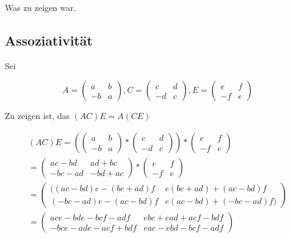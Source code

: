\documentclass{article}
\begin{document}
Was zu zeigen war.

\subsection*{Assoziativität}

Sei

\[
A =
    \begin{pmatrix}
      a & b \\
      -b & a
    \end{pmatrix}
,
C =
    \begin{pmatrix}
      c & d \\
      -d & c
    \end{pmatrix}
,
E =
    \begin{pmatrix}
      e & f \\
      -f & e
    \end{pmatrix}
\]

Zu zeigen ist, das
\((AC)E=A(CE)\)

\[
\begin{split}
(AC)E
=
\left (
    \begin{pmatrix}
      a & b \\
      -b & a
    \end{pmatrix}
    *
    \begin{pmatrix}
      c & d \\
      -d & c
    \end{pmatrix}
\right )
*
\begin{pmatrix}
  e & f \\
  -f & e
\end{pmatrix}
\\
=
\begin{pmatrix}
  ac-bd    & ad + bc \\
  -bc - ad & -bd + ac
\end{pmatrix}
*
\begin{pmatrix}
  e & f \\
  -f & e
\end{pmatrix}
\\
=
\begin{pmatrix}
  ((a c - b d) e - (b c + a d) f &  e (b c + a d) + (a c - b d) f \\
  (-b c - a d) e - (a c - b d) f & e (a c - b d) + (-b c - a d) f)
\end{pmatrix}
\\
=
\begin{pmatrix}
  ace - bde - bcf - adf & ebc + ead + acf - bdf \\
  -bce - ade - acf + bdf & eac - ebd - bcf - adf
\end{pmatrix}
\end{split}
\]
\end{document}
